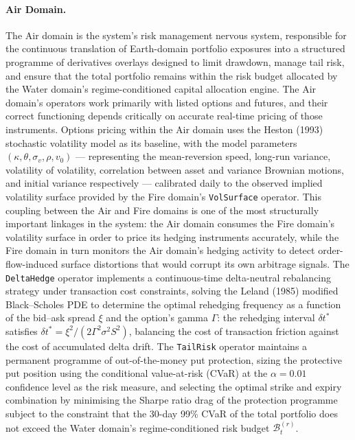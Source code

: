 \documentclass[12pt,openany]{book}
\numberwithin{equation}{chapter}
\theoremstyle{plain}
\theoremstyle{definition}
\theoremstyle{remark}
\begin{document}
\paragraph{Air Domain.}
The Air domain is the system's risk management nervous system, responsible for the continuous translation of Earth-domain portfolio exposures into a structured programme of derivatives overlays designed to limit drawdown, manage tail risk, and ensure that the total portfolio remains within the risk budget allocated by the Water domain's regime-conditioned capital allocation engine. The Air domain's operators work primarily with listed options and futures, and their correct functioning depends critically on accurate real-time pricing of those instruments. Options pricing within the Air domain uses the Heston (1993) stochastic volatility model as its baseline, with the model parameters $(\kappa, \theta, \sigma_v, \rho, v_0)$ — representing the mean-reversion speed, long-run variance, volatility of volatility, correlation between asset and variance Brownian motions, and initial variance respectively — calibrated daily to the observed implied volatility surface provided by the Fire domain's \texttt{VolSurface} operator. This coupling between the Air and Fire domains is one of the most structurally important linkages in the system: the Air domain consumes the Fire domain's volatility surface in order to price its hedging instruments accurately, while the Fire domain in turn monitors the Air domain's hedging activity to detect order-flow-induced surface distortions that would corrupt its own arbitrage signals. The \texttt{DeltaHedge} operator implements a continuous-time delta-neutral rebalancing strategy under transaction cost constraints, solving the Leland (1985) modified Black--Scholes PDE to determine the optimal rehedging frequency as a function of the bid--ask spread $\xi$ and the option's gamma $\Gamma$: the rehedging interval $\delta t^*$ satisfies $\delta t^* = \xi^2 / (2 \Gamma^2 \sigma^2 S^2)$, balancing the cost of transaction friction against the cost of accumulated delta drift. The \texttt{TailRisk} operator maintains a permanent programme of out-of-the-money put protection, sizing the protective put position using the conditional value-at-risk (CVaR) at the $\alpha = 0.01$ confidence level as the risk measure, and selecting the optimal strike and expiry combination by minimising the Sharpe ratio drag of the protection programme subject to the constraint that the 30-day 99\% CVaR of the total portfolio does not exceed the Water domain's regime-conditioned risk budget $\mathcal{B}^{(r)}_t$.
\end{document}
